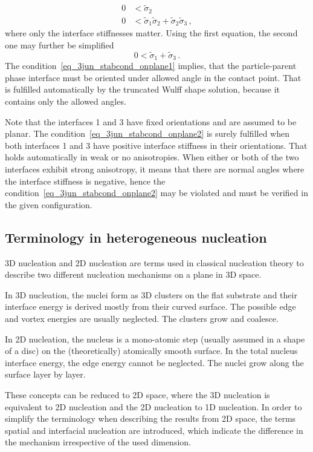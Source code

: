 	\begin{align}
		0 &< \tilde{\sigma}_2  \label{eq_3jun_stabcond_onplane1}\\
		0 &< \tilde{\sigma}_1\tilde{\sigma}_2 + \tilde{\sigma}_2\tilde{\sigma}_3 \,,  
	\end{align}
	where only the interface stiffnesses matter. Using the first equation, the second one may further be simplified
	\begin{equation}
		0< \tilde{\sigma}_1 + \tilde{\sigma}_3 \,. \label{eq_3jun_stabcond_onplane2}
	\end{equation}
	The condition~\eqref{eq_3jun_stabcond_onplane1} implies, that the particle-parent phase interface must be oriented under allowed angle in the contact point. That is fulfilled automatically by the truncated Wulff shape solution, because it contains only the allowed angles. 
	
	Note that the interfaces 1 and 3 have fixed orientations and are assumed to be planar. The condition~\eqref{eq_3jun_stabcond_onplane2} is surely fulfilled when both interfaces 1 and 3 have positive interface stiffness in their orientations. That holds automatically in weak or no anisotropies. When either or both of the two interfaces exhibit strong anisotropy, it means that there are normal angles where the interface stiffness is negative, hence the condition~\eqref{eq_3jun_stabcond_onplane2} may be violated and must be verified in the given configuration.

	\subsection{Terminology in heterogeneous nucleation}
	3D nucleation and 2D nucleation are terms used in classical nucleation theory to describe two different nucleation mechanisms on a plane in 3D space. 
	
	In 3D nucleation, the nuclei form as 3D clusters on the flat substrate and their interface energy is derived mostly from their curved surface. The possible edge and vortex energies are usually neglected. The clusters grow and coalesce.
	
	In 2D nucleation, the nucleus is a mono-atomic step (usually assumed in a shape of a disc) on the (theoretically) atomically smooth surface. In the total nucleus interface energy, the edge energy cannot be neglected. The nuclei grow along the surface layer by layer. 
	
	These concepts can be reduced to 2D space, where the 3D nucleation is equivalent to 2D nucleation and the 2D nucleation to 1D nucleation. In order to simplify the terminology when describing the results from 2D space, the terms spatial and interfacial nucleation are introduced, which indicate the difference in the mechanism irrespective of the used dimension.
	
